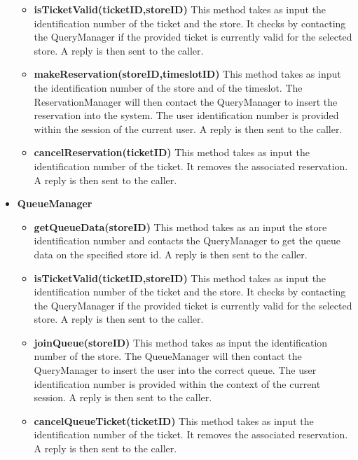 \begin{itemize}
\begin{itemize}
        \item \textbf{isTicketValid(ticketID,storeID)}
        This method takes as input the identification number of the ticket and the store. It checks by contacting the QueryManager if the provided ticket is currently valid for the selected store. 
        A reply is then sent to the caller. 

        \item \textbf{makeReservation(storeID,timeslotID)}
        This method takes as input the identification number of the store and of the timeslot. The ReservationManager will then contact the QueryManager to insert the reservation into the system. The user identification number is provided within the session of the current user. A reply is then sent to the caller. 

        \item \textbf{cancelReservation(ticketID)}
        This method takes as input the identification number of the ticket. It removes the associated reservation. 
        A reply is then sent to the caller. 
    \end{itemize}

    \item \textbf{QueueManager}
    \begin{itemize}
        \item \textbf{getQueueData(storeID)}
        This method takes as an input the store identification number and contacts the QueryManager to get the queue data on the specified store id. A reply is then sent to the caller.

        \item \textbf{isTicketValid(ticketID,storeID)}
        This method takes as input the identification number of the ticket and the store. It checks by contacting the QueryManager if the provided ticket is currently valid for the selected store. 
        A reply is then sent to the caller. 

        \item \textbf{joinQueue(storeID)}
        This method takes as input the identification number of the store. The QueueManager will then contact the QueryManager to insert the user into the correct queue. The user identification number is provided within the context of the current session.  
        A reply is then sent to the caller. 

        \item \textbf{cancelQueueTicket(ticketID)}
        This method takes as input the identification number of the ticket. It removes the associated reservation. 
        A reply is then sent to the caller. 
    \end{itemize}


\end{itemize}
